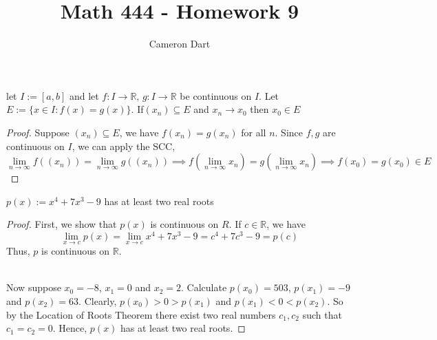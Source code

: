 \documentclass[12pt]{article}
\newcommand{\R}{\mathbb{R}}
\newcommand{\nifty}{\lim_{n \rightarrow \infty}}
\newcommand{\I}{I:=[a,b]}
\newcommand{\fI}{f: I \rightarrow \mathbb{R}}
\newcommand{\gI}{g: I \rightarrow \mathbb{R}}
\newenvironment{claim}[2][Claim]{\begin{trivlist}
		\item[\hskip \labelsep {\bfseries #1}\hskip \labelsep {\bfseries #2}]}{\end{trivlist}}
\begin{document}
	\title{Math 444 - Homework 9}
	\author{Cameron Dart}
	\maketitle
\begin{claim}{5.3.2}
let $\I$ and let $\fI,\, \gI$  be continuous on $I$. Let $E:= \{ x \in I : f(x) = g(x)\}$. If$(x_n)\subseteq E$ and $x_n \rightarrow x_0$ then $x_0 \in E$ 
\end{claim}
\begin{proof}
	Suppose $(x_n) \subseteq E$, we have $f(x_n) = g(x_n)$ for all $n$. Since $f,g$ are continuous on $I$, we can apply the SCC, 
	\[
		\nifty f((x_n)) = \nifty g((x_n)) \implies f(\nifty x_n) = g(\nifty x_n) \implies f(x_0) = g(x_0) \in E
	\]
\end{proof}
\begin{claim}{5.3.5}
	$p(x) := x^4 + 7x^3 - 9$ has at least two real roots
\end{claim}
\begin{proof}
	First, we show that $p(x)$ is continuous on $R$. 
	If $c \in \R$, we have
	\[
		\lim_{x \rightarrow c} p(x) = \lim_{x \rightarrow c} x^4 + 7x^3 - 9 = c^4 + 7c^3 - 9 = p(c)
	\]
	Thus, $p$ is continuous on $\R$.
	\begin{comment}
	A formal proof using the  \epsilon \delta definition of continuity is too verbose and unnecessary
	Given $\epsilon > 0$, we choose  $\delta(\epsilon) = \inf \{1, \frac{\epsilon}{}\} $ so that if $x,c \in \R$ and $| x - c| < \delta(\epsilon)$ then we have,
	
	\begin{align*}
	|f(x) - f(c)| &= |x^4+ 7x^3 - 9 - (c^4 + 7c^3 - 9)| \\
						&= |(x - c)(x+c)(x^2 + c^2) + 7x^3 - 7c^3| \\
						&\leq |(x - c)(x+c)(x^2 + c^2)| + |7(x^3 - c^3)| \\
						&\leq |x-c| |(x + c)(x^2 + c^2)| + |7(x^3 - c^3)| \\
						&= |x-c||(2c-1)((c-1)^2 + c^2| + |7((c-1)^3 - c^3)| \\
						&= |x-c||
	\end{align*}
	In order to bound the coefficient on $|x-c|$ we restrict $x$ to the following condition $|x - c| < 1$
	\end{comment}
	\\Now suppose $x_0 = -8$, $x_1 = 0$ and $x_2 = 2$. 
	Calculate  $p(x_0) = 503$, $p(x_1) = -9$ and $p(x_2) = 63$. Clearly, 
	 $p(x_0) > 0 > p(x_1)$ and $p(x_1) < 0 < p(x_2)$. So by the Location of Roots Theorem there exist two real numbers $c_1, c_2$ such that $c_1 = c_2 = 0$.
	Hence, $p(x)$ has at least two real roots.
\end{proof}
\end{document}

